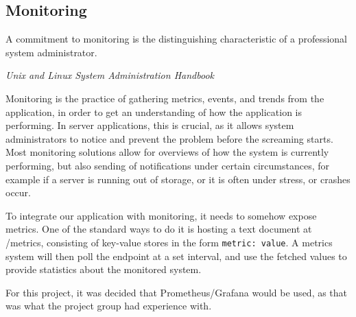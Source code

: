 \subsection{Monitoring}
\epigraph{A commitment to monitoring is the distinguishing characteristic of a professional system administrator.}{\textit{Unix and Linux System Administration Handbook}}

Monitoring is the practice of gathering metrics, events, and trends from the application, in order to get an understanding of how the application is performing.
In server applications, this is crucial, as it allows system administrators to notice and prevent the problem before the screaming starts.
Most monitoring solutions allow for overviews of how the system is currently performing, but also sending of notifications under certain circumstances, for example if a server is running out of storage, or it is often under stress, or crashes occur.

To integrate our application with monitoring, it needs to somehow expose metrics.
One of the standard ways to do it is hosting a text document at /metrics, consisting of key-value stores in the form \texttt{metric: value}.
A metrics system will then poll the endpoint at a set interval, and use the fetched values to provide statistics about the monitored system.

For this project, it was decided that Prometheus/Grafana would be used, as that was what the project group had experience with.

